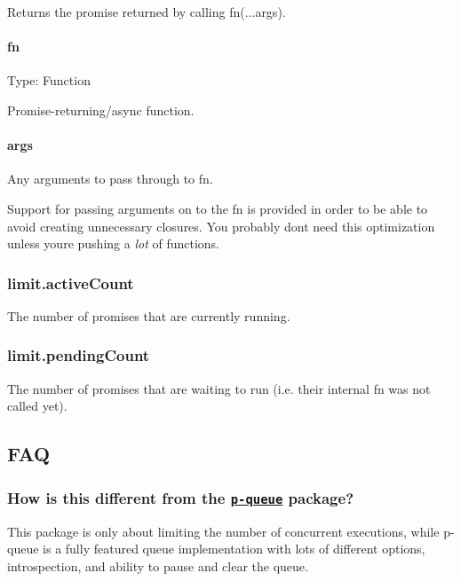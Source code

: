 Returns the promise returned by calling {\ttfamily fn(...args)}.

\paragraph*{fn}

Type\+: {\ttfamily Function}

Promise-\/returning/async function.

\paragraph*{args}

Any arguments to pass through to {\ttfamily fn}.

Support for passing arguments on to the {\ttfamily fn} is provided in order to be able to avoid creating unnecessary closures. You probably don\textquotesingle{}t need this optimization unless you\textquotesingle{}re pushing a {\itshape lot} of functions.

\subsubsection*{limit.\+active\+Count}

The number of promises that are currently running.

\subsubsection*{limit.\+pending\+Count}

The number of promises that are waiting to run (i.\+e. their internal {\ttfamily fn} was not called yet).

\subsection*{F\+AQ}

\subsubsection*{How is this different from the \href{https://github.com/sindresorhus/p-queue}{\tt {\ttfamily p-\/queue}} package?}

This package is only about limiting the number of concurrent executions, while {\ttfamily p-\/queue} is a fully featured queue implementation with lots of different options, introspection, and ability to pause and clear the queue.

